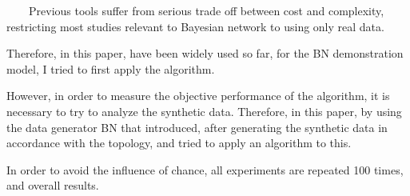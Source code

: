~~~~Previous tools suffer from serious trade off between cost and complexity, restricting most studies relevant to Bayesian network to using only real data.

Therefore, in this paper, have been widely used so far, for the BN demonstration model, I tried to first apply the algorithm.

However, in order to measure the objective performance of the algorithm, it is necessary to try to analyze the synthetic data. Therefore, in this paper, by using the data generator BN that introduced, after generating the synthetic data in accordance with the topology, and tried to apply an algorithm to this.

In order to avoid the influence of chance, all experiments are repeated 100 times, and overall results.